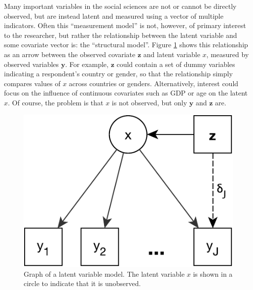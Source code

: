 \documentclass[letterpaper,12pt]{article}
\begin{document}
Many important variables in the social sciences are not or cannot be directly observed, but are instead latent  \citep{bollen2002latent} and measured using a vector of multiple indicators.
Often this ``measurement model'' is not, however, of primary interest to the researcher, but rather  the relationship between the latent variable and some covariate vector is: the ``structural model''. Figure \ref{fig:LVM} shows this relationship as an arrow between the observed covariate $\mathbf{z}$ and latent variable $x$, measured by observed variables $\mathbf{y}$.
For example, $\mathbf{z}$ could contain a set of dummy variables indicating a respondent's country or gender, so that the relationship simply compares values of $x$ across countries or genders. Alternatively, interest could focus on the influence of continuous covariates such as GDP or age on the latent $x$. Of course, the problem is that $x$ is not observed, but only $\mathbf{y}$ and $\mathbf{z}$ are. 

\begin{figure}\centering
	\includegraphics[width=.4\textwidth]{LVM}
	\caption{Graph of a latent variable model. The latent variable $x$ is shown in a circle to indicate that it is unobserved. }
	\label{fig:LVM}
\end{figure}
\end{document}
